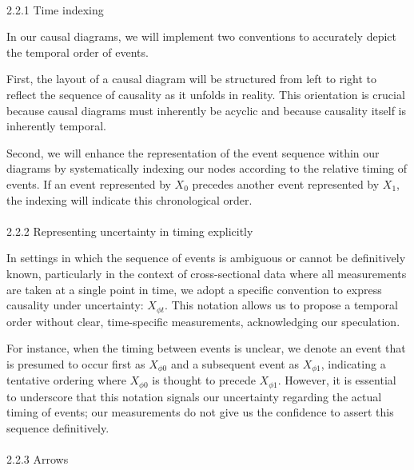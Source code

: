 \documentclass[
  singlecolumn]{article}
\makeatletter
\let\oldparagraph\paragraph
\renewcommand{\paragraph}{
    \@ifstar
      \xxxParagraphStar
      \xxxParagraphNoStar
  }
\newcommand{\xxxParagraphStar}[1]{\oldparagraph*{#1}\mbox{}}
\newcommand{\xxxParagraphNoStar}[1]{\oldparagraph{#1}\mbox{}}
\makeatother
\begin{document}
\paragraph{2.2.1 Time indexing}\label{time-indexing}

In our causal diagrams, we will implement two conventions to accurately
depict the temporal order of events.

First, the layout of a causal diagram will be structured from left to
right to reflect the sequence of causality as it unfolds in reality.
This orientation is crucial because causal diagrams must inherently be
acyclic and because causality itself is inherently temporal.

Second, we will enhance the representation of the event sequence within
our diagrams by systematically indexing our nodes according to the
relative timing of events. If an event represented by \(X_0\) precedes
another event represented by \(X_1\), the indexing will indicate this
chronological order.

\paragraph{2.2.2 Representing uncertainty in timing
explicitly}\label{representing-uncertainty-in-timing-explicitly}

In settings in which the sequence of events is ambiguous or cannot be
definitively known, particularly in the context of cross-sectional data
where all measurements are taken at a single point in time, we adopt a
specific convention to express causality under uncertainty:
\(X_{\phi t}\). This notation allows us to propose a temporal order
without clear, time-specific measurements, acknowledging our
speculation.

For instance, when the timing between events is unclear, we denote an
event that is presumed to occur first as \(X_{\phi 0}\) and a subsequent
event as \(X_{\phi 1}\), indicating a tentative ordering where
\(X_{\phi 0}\) is thought to precede \(X_{\phi 1}\). However, it is
essential to underscore that this notation signals our uncertainty
regarding the actual timing of events; our measurements do not give us
the confidence to assert this sequence definitively.

\paragraph{2.2.3 Arrows}\label{arrows}
\end{document}

